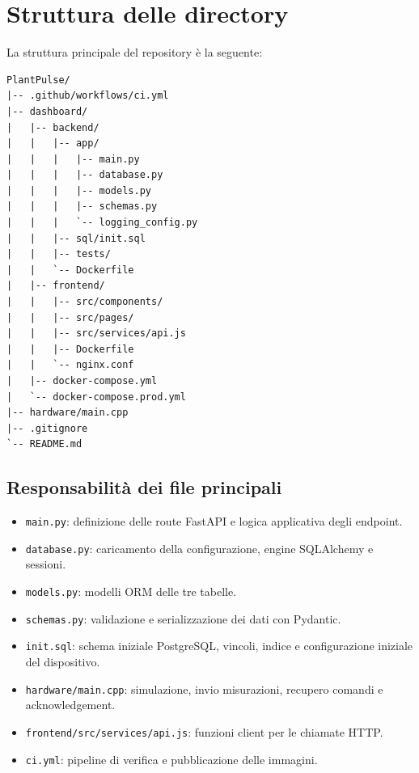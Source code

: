 \chapter{Struttura delle directory}

La struttura principale del repository è la seguente:

\begin{lstlisting}
PlantPulse/
|-- .github/workflows/ci.yml
|-- dashboard/
|   |-- backend/
|   |   |-- app/
|   |   |   |-- main.py
|   |   |   |-- database.py
|   |   |   |-- models.py
|   |   |   |-- schemas.py
|   |   |   `-- logging_config.py
|   |   |-- sql/init.sql
|   |   |-- tests/
|   |   `-- Dockerfile
|   |-- frontend/
|   |   |-- src/components/
|   |   |-- src/pages/
|   |   |-- src/services/api.js
|   |   |-- Dockerfile
|   |   `-- nginx.conf
|   |-- docker-compose.yml
|   `-- docker-compose.prod.yml
|-- hardware/main.cpp
|-- .gitignore
`-- README.md
\end{lstlisting}

\section{Responsabilità dei file principali}
\begin{itemize}
    \item \texttt{main.py}: definizione delle route FastAPI e logica applicativa degli endpoint.
    \item \texttt{database.py}: caricamento della configurazione, engine SQLAlchemy e sessioni.
    \item \texttt{models.py}: modelli ORM delle tre tabelle.
    \item \texttt{schemas.py}: validazione e serializzazione dei dati con Pydantic.
    \item \texttt{init.sql}: schema iniziale PostgreSQL, vincoli, indice e configurazione iniziale del dispositivo.
    \item \texttt{hardware/main.cpp}: simulazione, invio misurazioni, recupero comandi e acknowledgement.
    \item \texttt{frontend/src/services/api.js}: funzioni client per le chiamate HTTP.
    \item \texttt{ci.yml}: pipeline di verifica e pubblicazione delle immagini.
\end{itemize}
